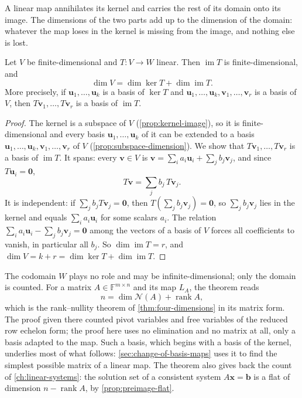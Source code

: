 A linear map annihilates its kernel and carries the rest of its domain onto its image. The dimensions of the two parts add up to the dimension of the domain: whatever the map loses in the kernel is missing from the image, and nothing else is lost.

\begin{theorem}
\label{thm:rank-nullity}
Let $V$ be finite-dimensional and $T\colon V\to W$ linear. Then $\operatorname{im}T$ is finite-dimensional, and
\[
\dim V=\dim\ker T+\dim\operatorname{im}T .
\]
More precisely, if $\mathbf u_1,\ldots,\mathbf u_k$ is a basis of $\ker T$ and $\mathbf u_1,\ldots,\mathbf u_k,\mathbf v_1,\ldots,\mathbf v_r$ is a basis of $V$, then $T\mathbf v_1,\ldots,T\mathbf v_r$ is a basis of $\operatorname{im}T$.
\end{theorem}

\begin{proof}
The kernel is a subspace of $V$ (\cref{prop:kernel-image}), so it is finite-dimensional and every basis $\mathbf u_1,\ldots,\mathbf u_k$ of it can be extended to a basis $\mathbf u_1,\ldots,\mathbf u_k,\mathbf v_1,\ldots,\mathbf v_r$ of $V$ (\cref{prop:subspace-dimension}). We show that $T\mathbf v_1,\ldots,T\mathbf v_r$ is a basis of $\operatorname{im}T$. It spans: every $\mathbf v\in V$ is $\mathbf v=\sum_ia_i\mathbf u_i+\sum_jb_j\mathbf v_j$, and since $T\mathbf u_i=\mathbf 0$,
\[
T\mathbf v=\sum_jb_j\,T\mathbf v_j .
\]
It is independent: if $\sum_jb_jT\mathbf v_j=\mathbf 0$, then $T(\sum_jb_j\mathbf v_j)=\mathbf 0$, so $\sum_jb_j\mathbf v_j$ lies in the kernel and equals $\sum_ia_i\mathbf u_i$ for some scalars $a_i$. The relation $\sum_ia_i\mathbf u_i-\sum_jb_j\mathbf v_j=\mathbf 0$ among the vectors of a basis of $V$ forces all coefficients to vanish, in particular all $b_j$. So $\dim\operatorname{im}T=r$, and $\dim V=k+r=\dim\ker T+\dim\operatorname{im}T$.
\end{proof}

The codomain $W$ plays no role and may be infinite-dimensional; only the domain is counted. For a matrix $A\in\mathbb F^{m\times n}$ and its map $L_A$, the theorem reads
\[
n=\dim\mathcal N(A)+\operatorname{rank}A,
\]
which is the rank--nullity theorem of \cref{thm:four-dimensions} in its matrix form. The proof given there counted pivot variables and free variables of the reduced row echelon form; the proof here uses no elimination and no matrix at all, only a basis adapted to the map. Such a basis, which begins with a basis of the kernel, underlies most of what follows: \cref{sec:change-of-basis-maps} uses it to find the simplest possible matrix of a linear map. The theorem also gives back the count of \cref{ch:linear-systems}: the solution set of a consistent system $A\mathbf x=\mathbf b$ is a flat of dimension $n-\operatorname{rank}A$, by \cref{prop:preimage-flat}.

